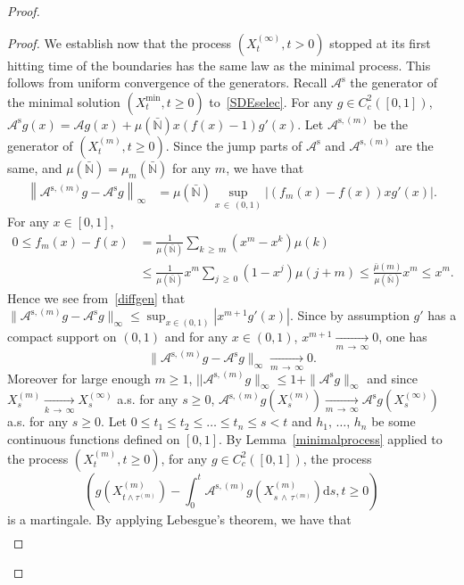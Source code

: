 \documentclass[AHL,Unicode,longabstracts,published]{cedram}
\newcommand{\ddr}{\mathrm{d}}
\newcommand{\rms}{\mathrm{s}}
\newcommand{\bbN}{\mathbb{N}}
\newcommand{\clA}{\mathcal{A}}
\begin{document}
\begin{proof}
\begin{proof}
We establish now that the process $(X^{(\infty)}_t,t>0)$ stopped at its first hitting time of the boundaries has the same law as the minimal process. This follows from uniform convergence of the generators. Recall $\clA^{\rms}$ the generator of the minimal solution $(X^{\min}_t,t\geq 0)$ to~\eqref{SDEselec}. For any $g\in C^2_c([0,1])$, $\clA^{\rms}g(x)=\clA g(x)+\mu(\bar{\bbN})x(f(x)-1)g'(x)$. Let $\clA^{\rms,(m)}$ be the generator of $(X_t^{(m)},t\geq 0)$. Since the jump parts of $\clA^{\rms}$ and $\clA^{\rms,(m)}$ are the same, and $\mu(\bar{\bbN})=\mu_m(\bar{\bbN})$ for any $m$, we have that
\begin{align}\label{diffgen}
\left\|\clA^{\rms,(m)}g-\clA^{\rms}g\right\|_{\infty}&=\mu(\bar{\bbN})\underset{x\,\in\, (0,1)}{\sup}\left|(f_m(x)-f(x))xg'(x)\right|.
\end{align}
For any $x\in [0,1]$,
\begin{align*}
0\leq f_m(x)-f(x)&=\frac{1}{\mu(\bar{\bbN})}\sum_{k\,\geq\,m}\left(x^{m}-x^{k}\right)\mu(k)\\
&\leq \frac{1}{\mu(\bar{\bbN})}x^{m}\sum_{j\,\geq\,0}(1-x^{j})\mu(j+m)\leq \frac{\bar{\mu}(m)}{\mu(\bar{\bbN})}x^m\leq x^m.
\end{align*}
Hence we see from~\eqref{diffgen} that $\|\clA^{\rms,(m)}g-\clA^{\rms}g\|_{\infty}\leq \sup_{x\in (0,1)}|x^{m+1}g'(x)|$. Since by assumption $g'$ has a compact support on $(0,1)$ and for any $x\in (0,1)$, $x^{m+1}\underset{m\,\rightarrow\,\infty}{\longrightarrow}0$, one has
\begin{equation}\label{convunifAm}
\|\clA^{\rms,(m)}g-\clA^{\rms}g\|_{\infty}\underset{m\,\rightarrow\,\infty}{\longrightarrow} 0.
\end{equation}
Moreover for large enough $m\geq 1$, $||\clA^{\rms,(m)}g\|_\infty\leq 1+\|\clA^{\rms}g\|_\infty$ and since $X_s^{(m)}\underset{k\,\rightarrow\,\infty}{\longrightarrow} X_s^{(\infty)}$ a.s. for any $s\geq 0$, $\clA^{\rms,(m)}g(X_s^{(m)})\underset{m\,\rightarrow\,\infty}{\longrightarrow} \clA^{\rms}g(X_s^{(\infty)})$ a.s. for any $s\geq 0$. Let $0\leq t_1\leq t_2\leq \ldots \leq t_n\leq s<t$ and $h_1,\,\ldots,\,h_n$ be some continuous functions defined on $[0,1]$. By Lemma~\ref{minimalprocess} applied to the process $(X_t^{(m)},t\geq 0)$, for any $g\in C_c^{2}([0,1])$, the process
\[
\left(g\left(X_{t\wedge \tau^{(m)}}^{(m)} \right)-\int_{0}^{t}\clA^{\rms,(m)}g\left(X_{s\,\wedge\,\tau^{(m)}}^{(m)}\right)\ddr s, t\geq 0\right)
\]
is a martingale. By applying Lebesgue's theorem, we have that
\begin{multline*}

\end{multline*}
\end{proof}
\end{proof}
\end{document}

